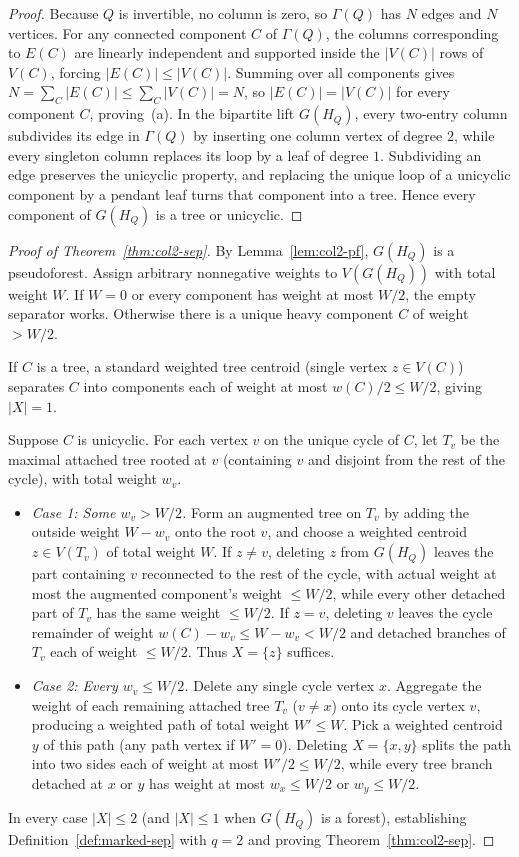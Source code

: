 \documentclass[11pt,reqno]{amsart}
\numberwithin{equation}{section}
\theoremstyle{definition}
\theoremstyle{remark}
\begin{document}
\begin{proof}
Because $Q$ is invertible, no column is zero, so $\Gamma(Q)$ has $N$ edges and $N$ vertices. For any connected component $C$ of $\Gamma(Q)$, the columns corresponding to $E(C)$ are linearly independent and supported inside the $|V(C)|$ rows of $V(C)$, forcing $|E(C)|\le |V(C)|$. Summing over all components gives $N = \sum_C |E(C)| \le \sum_C |V(C)| = N$, so $|E(C)| = |V(C)|$ for every component $C$, proving~(a). In the bipartite lift $G(H_Q)$, every two-entry column subdivides its edge in $\Gamma(Q)$ by inserting one column vertex of degree $2$, while every singleton column replaces its loop by a leaf of degree $1$. Subdividing an edge preserves the unicyclic property, and replacing the unique loop of a unicyclic component by a pendant leaf turns that component into a tree. Hence every component of $G(H_Q)$ is a tree or unicyclic.
\end{proof}

\begin{proof}[Proof of Theorem~\ref{thm:col2-sep}]
By Lemma~\ref{lem:col2-pf}, $G(H_Q)$ is a pseudoforest. Assign arbitrary nonnegative weights to $V(G(H_Q))$ with total weight $W$. If $W=0$ or every component has weight at most $W/2$, the empty separator works. Otherwise there is a unique heavy component $C$ of weight $> W/2$.

If $C$ is a tree, a standard weighted tree centroid (single vertex $z\in V(C)$) separates $C$ into components each of weight at most $w(C)/2 \le W/2$, giving $|X|=1$.

Suppose $C$ is unicyclic. For each vertex $v$ on the unique cycle of $C$, let $T_v$ be the maximal attached tree rooted at $v$ (containing $v$ and disjoint from the rest of the cycle), with total weight $w_v$.
\begin{itemize}[leftmargin=1.5em]
\item \emph{Case 1: Some $w_v > W/2$.} Form an augmented tree on $T_v$ by adding the outside weight $W - w_v$ onto the root $v$, and choose a weighted centroid $z\in V(T_v)$ of total weight $W$. If $z\neq v$, deleting $z$ from $G(H_Q)$ leaves the part containing $v$ reconnected to the rest of the cycle, with actual weight at most the augmented component's weight $\le W/2$, while every other detached part of $T_v$ has the same weight $\le W/2$. If $z=v$, deleting $v$ leaves the cycle remainder of weight $w(C) - w_v \le W - w_v < W/2$ and detached branches of $T_v$ each of weight $\le W/2$. Thus $X=\{z\}$ suffices.
\item \emph{Case 2: Every $w_v \le W/2$.} Delete any single cycle vertex $x$. Aggregate the weight of each remaining attached tree $T_v$ ($v\neq x$) onto its cycle vertex $v$, producing a weighted path of total weight $W' \le W$. Pick a weighted centroid $y$ of this path (any path vertex if $W'=0$). Deleting $X = \{x,y\}$ splits the path into two sides each of weight at most $W'/2 \le W/2$, while every tree branch detached at $x$ or $y$ has weight at most $w_x\le W/2$ or $w_y\le W/2$.
\end{itemize}
In every case $|X|\le 2$ (and $|X|\le 1$ when $G(H_Q)$ is a forest), establishing Definition~\ref{def:marked-sep} with $q=2$ and proving Theorem~\ref{thm:col2-sep}.
\end{proof}
\end{document}
